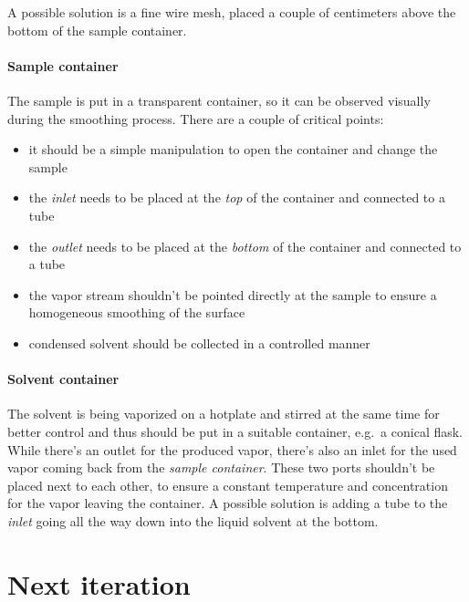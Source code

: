\documentclass[a4paper, 12pt]{paper}
\begin{document}
A possible solution is a fine wire mesh, placed a couple of centimeters above
the bottom of the sample container.

\paragraph{Sample container}
The sample is put in a transparent container, so it can be observed visually
during the smoothing process. There are a couple of critical points:
\begin{itemize}
    \item it should be a simple manipulation to open the container and change
        the sample
    \item the \emph{inlet} needs to be placed at the \emph{top} of the container
        and connected to a tube
    \item the \emph{outlet} needs to be placed at the \emph{bottom} of the
        container and connected to a tube
    \item the vapor stream shouldn't be pointed directly at the sample to ensure
        a homogeneous smoothing of the surface
    \item condensed solvent should be collected in a controlled manner
\end{itemize}

\paragraph{Solvent container}
The solvent is being vaporized on a hotplate and stirred at the same time for
better control and thus should be put in a suitable container, e.g.\ a conical
flask. While there's an outlet for the produced vapor, there's also an inlet
for the used vapor coming back from the \emph{sample container}. These two
ports shouldn't be placed next to each other, to ensure a constant temperature
and concentration for the vapor leaving the container. A possible solution is
adding a tube to the \emph{inlet} going all the way down into the liquid solvent
at the bottom.




\section{Next iteration}
\end{document}
